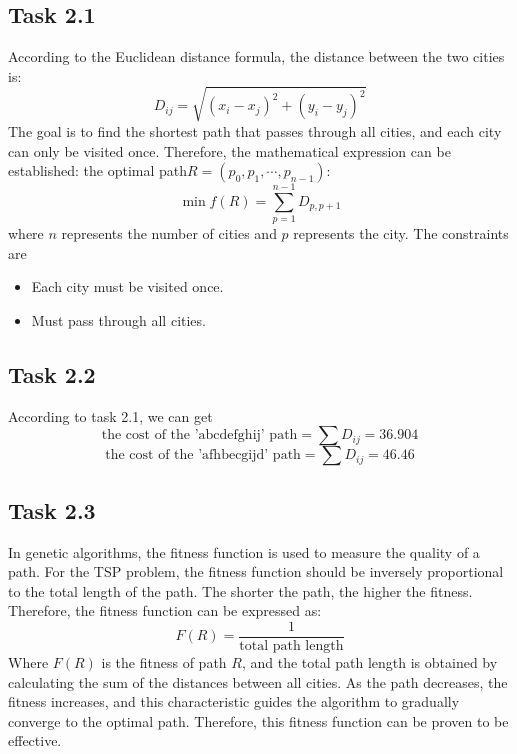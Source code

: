 \documentclass[onecolumn,oneside]{SUSTechHomework}
\begin{document}
    \subsection*{Task 2.1}
    According to the Euclidean distance formula, the distance between the two cities is:
    \[ D_{ij} = \sqrt{(x_i - x_j)^2 + (y_i - y_j)^2} \]
    The goal is to find the shortest path that passes through all cities, and each city can only be visited once.
    Therefore, the mathematical expression can be established: the optimal path\(R = (p_0, p_1, \cdots, p_{n-1})\): 
    \[\min f(R) = \sum_{p = 1}^{n - 1} D_{p, p+1}\]
    where \(n\) represents the number of cities and \(p\) represents the city. The constraints are
    \begin{itemize}
        \item Each city must be visited once.
        \item Must pass through all cities.
    \end{itemize}

    \subsection*{Task 2.2}
    According to task 2.1, we can get\[ \text{the cost of the 'abcdefghij' path} = \sum D_{ij} = 36.904 \]
    \[ \text{the cost of the 'afhbecgijd' path} = \sum D_{ij} = 46.46 \]

    \subsection*{Task 2.3}
    In genetic algorithms, the fitness function is used to measure the quality of a path. For the TSP problem, the fitness function should be inversely proportional to the total length of the path. The shorter the path, the higher the fitness. Therefore, the fitness function can be expressed as:
    \[
    F(R) = \frac{1}{\text{total path length}}
    \]
    Where \( F(R) \) is the fitness of path \( R \), and the total path length is obtained by calculating the sum of the distances between all cities.
    As the path decreases, the fitness increases, and this characteristic guides the algorithm to gradually converge to the optimal path. Therefore, this fitness function can be proven to be effective.
    
\end{document}
